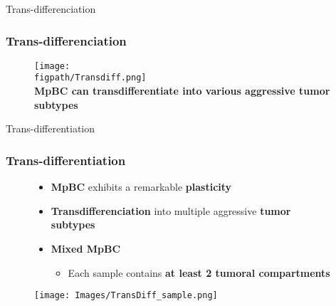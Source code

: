 \documentclass[aspectratio=169]{beamer}
\newcommand{\figpath}{/mnt/datadisk/Jordan/Delivrables/Rapports/Rapport_stage/Figures/Sans_légendes}
\begin{document}
\begin{frame}{Trans-differenciation}
    \frametitle<presentation>{Trans-differenciation}
    
    \begin{figure}[h]
        \centering
        \texttt{[image: \\figpath/Transdiff.png]}\\
        \centering
        \textbf{MpBC can transdifferentiate into various aggressive tumor subtypes}
    \end{figure}
\end{frame}

\begin{frame}{Trans-differentiation}
    \frametitle{Trans-differentiation}

    \begin{figure}
        \centering
        \begin{minipage}{0.48\textwidth}
            \small
            \begin{itemize}
                \item \textbf{MpBC} exhibits a remarkable \textbf{plasticity} \\
                \item \textbf{Transdifferenciation} into multiple aggressive \textbf{tumor subtypes}\\
                \item \textbf{Mixed MpBC}
                    \begin{itemize}
                        \item Each sample contains \textbf{at least 2 tumoral compartments}
                    \end{itemize}
            \end{itemize}
        \end{minipage}
        \hfill
        \begin{minipage}{0.48\textwidth}
            \centering
            \texttt{[image: Images/TransDiff\_sample.png]}
        \end{minipage}
        
    \end{figure}
\end{frame}
\end{document}
